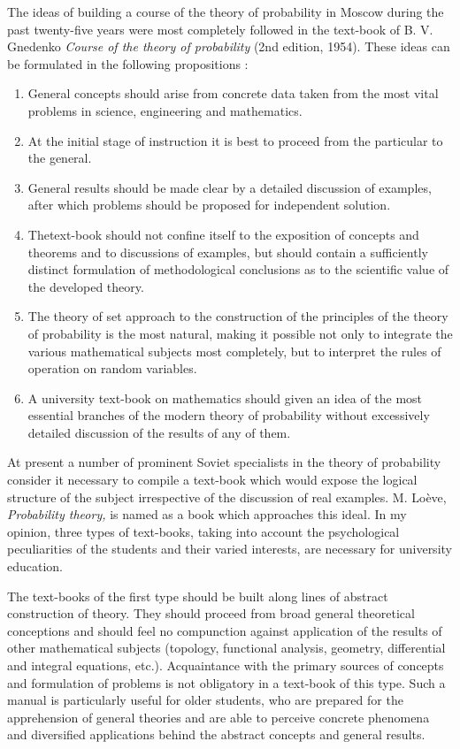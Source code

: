 The ideas of building a course of the theory of probability in Moscow
during the past twenty-five years were most completely followed in the
text-book of B. V. Gnedenko \textit{Course of the theory of
  probability} (2nd edition, 1954). These ideas can be formulated in
the following propositions :
\begin{enumerate}
\item General concepts should arise from concrete data taken from the
  most vital problems in science, engineering and mathematics. 

\item At the initial stage of instruction it is best to proceed from
  the particular to the general.

\item General results should be made clear by a detailed discussion of
  examples, after which problems should be proposed for independent
  solution.

\item The\pageoriginale text-book should not confine itself to the
  exposition of concepts and theorems and to discussions of examples,
  but should contain a sufficiently distinct formulation of
  methodological conclusions as to the scientific value of the
  developed theory.

\item The theory of set approach to the construction of the principles
  of the theory of probability is the most natural, making it possible
  not only to integrate the various mathematical subjects most
  completely, but to interpret the rules of operation on random
  variables.

\item A university text-book on mathematics should given an idea of
  the most essential branches of the modern theory of probability
  without excessively detailed discussion of the results of any of them.
\end{enumerate}

At present a number of prominent Soviet specialists in the theory of
probability consider it necessary to compile a text-book which would
expose the logical structure of the subject irrespective of the
discussion of real examples. M. Lo\`eve, \textit{Probability theory,}
is named as a book which approaches this ideal. In my opinion, three
types of text-books, taking into account the psychological
peculiarities of the students and their varied interests, are
necessary for university education.

The text-books of the first type should be built along lines of
abstract construction of theory. They should proceed from broad
general theoretical conceptions and should feel no compunction against
application of the results of other mathematical subjects (topology,
functional analysis, geometry, differential and integral equations,
etc.). Acquaintance with the primary sources of concepts and
formulation of problems is not obligatory in a text-book of this
type. Such a manual is particularly useful for older students, who are
prepared for the apprehension of general theories and are able to
perceive concrete phenomena and diversified applications behind the
abstract concepts and general results.

